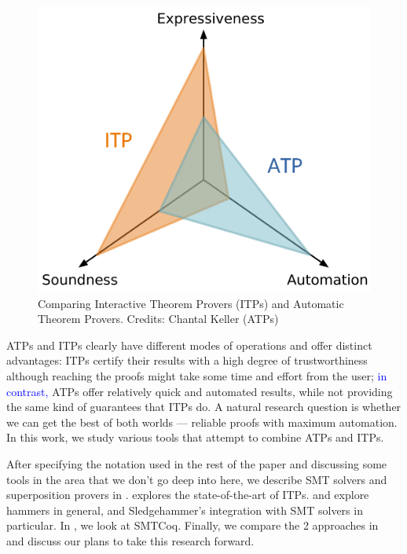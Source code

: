 \documentclass{article}
\newcommand{\ed}[1]{\textcolor{blue}{#1}}
\begin{document}
	\begin{figure}[t]
		\centering
		\includegraphics[scale=0.5]{coq.pdf}
		\caption{Comparing Interactive Theorem Provers (ITPs)
		and Automatic Theorem Provers. Credits: Chantal 
		Keller (ATPs)}
		\label{fig:graph}
	\end{figure}

	ATPs and ITPs clearly have different modes of operations
	and offer distinct advantages: ITPs certify their 
	results with a high degree of trustworthiness although 
	reaching the proofs might take some time and effort from 
	the user; \ed{in contrast,} ATPs offer relatively quick and automated results, 
	while not providing the same kind of guarantees that ITPs do.
	A natural research question is whether we can get the best 
	of both worlds --- reliable proofs with maximum automation. 
	In this work, we study various tools that 
	attempt to combine ATPs and ITPs.
	
	After specifying the notation used in the rest of the 
	paper and discussing some tools in the area that 
	we don't go deep into here, we describe SMT solvers
	and superposition provers in .
	 explores the state-of-the-art 
	of ITPs.  and 
	explore hammers in general, and Sledgehammer's
	integration with SMT solvers in particular. In
	, we look at SMTCoq. Finally, we 
	compare the 2 approaches in ~ and 
	discuss our plans to take this research forward.
\end{document}
